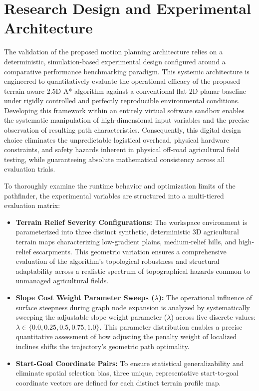 \section{Research Design and Experimental Architecture}

The validation of the proposed motion planning architecture relies on a deterministic,
simulation-based experimental design configured around a comparative performance benchmarking
paradigm. This systemic architecture is engineered to quantitatively evaluate the operational
efficacy of the proposed terrain-aware 2.5D A* algorithm against a conventional flat 2D planar
baseline under rigidly controlled and perfectly reproducible environmental conditions. Developing
this framework within an entirely virtual software sandbox enables the systematic manipulation of
high-dimensional input variables and the precise observation of resulting path characteristics.
Consequently, this digital design choice eliminates the unpredictable logistical overhead, physical
hardware constraints, and safety hazards inherent in physical off-road agricultural field testing,
while guaranteeing absolute mathematical consistency across all evaluation trials.

To thoroughly examine the runtime behavior and optimization limits of the pathfinder, the
experimental variables are structured into a multi-tiered evaluation matrix:

\begin{itemize}
    \item \textbf{Terrain Relief Severity Configurations:} The workspace environment is parameterized into three distinct synthetic, deterministic 3D agricultural terrain maps characterizing low-gradient plains, medium-relief hills, and high-relief escarpments. This geometric variation ensures a comprehensive evaluation of the algorithm's topological robustness and structural adaptability across a realistic spectrum of topographical hazards common to unmanaged agricultural fields.

    \item \textbf{Slope Cost Weight Parameter Sweeps ($\lambda$):} The operational influence of surface steepness during graph node expansion is analyzed by systematically sweeping the adjustable slope weight parameter ($\lambda$) across five discrete values: $\lambda \in \{0.0, \allowbreak 0.25, \allowbreak 0.5, \allowbreak 0.75, \allowbreak 1.0\}$. This parameter distribution enables a precise quantitative assessment of how adjusting the penalty weight of localized inclines shifts the trajectory's geometric path optimality.

    \item \textbf{Start-Goal Coordinate Pairs:} To ensure statistical generalizability and eliminate spatial selection bias, three unique, representative start-to-goal coordinate vectors are defined for each distinct terrain profile map.
\end{itemize}

